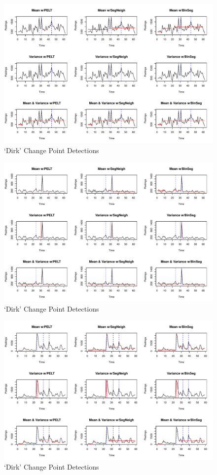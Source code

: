 \documentclass{uvamscse}	%
\begin{document}
\begin{figure}[h]
    \includegraphics[width=\textwidth]{figures/bolresults}
    \caption{`Dirk' Change Point Detections}
    \label{fig:bol}
\end{figure}


\begin{figure}[h]
    \includegraphics[width=\textwidth]{figures/connexxionresults}
    \caption{`Dirk' Change Point Detections}
    \label{fig:connexxion}
\end{figure}

\begin{figure}[h]
    \includegraphics[width=\textwidth]{figures/dapresults}
    \caption{`Dirk' Change Point Detections}
    \label{fig:dap}
\end{figure}
\end{document}
